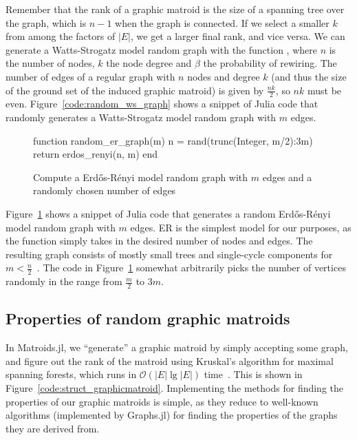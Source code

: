 Remember that the rank of a graphic matroid is the size of a spanning tree over the graph, which is $n-1$ when the graph is connected. If we select a smaller $k$ from among the factors of $|E|$, we get a larger final rank, and vice versa. We can generate a Watts-Strogatz model random graph with the function , where $n$ is the number of nodes, $k$ the node degree and $\beta$ the probability of rewiring. The number of edges of a regular graph with $n$ nodes and degree $k$ (and thus the size of the ground set of the induced graphic matroid) is given by $\frac{nk}{2}$, so $nk$ must be even. Figure~\ref{code:random_ws_graph} shows a snippet of Julia code that randomly generates a Watts-Strogatz model random graph with $m$ edges.

\begin{figure}[ht!]
  \begin{jllisting}
    
function random_er_graph(m)
  n = rand(trunc(Integer, m/2):3m)
  return erdos_renyi(n, m)
end

  \end{jllisting}
  \caption{Compute a Erdős-Rényi model random graph with $m$ edges and a randomly chosen number of edges}
  \label{code:random_er_graph}
\end{figure}

Figure~\ref{code:random_er_graph} shows a snippet of Julia code that generates a random Erdős-Rényi model random graph with $m$ edges. ER is the simplest model for our purposes, as the function  simply takes in the desired number of nodes and edges. The resulting graph consists of mostly small trees and single-cycle components for $m < \frac{n}{2}$~\cite{janson1993birth}. The code in Figure~\ref{code:random_er_graph} somewhat arbitrarily picks the number of vertices randomly in the range from $\frac{m}{2}$ to $3m$.


\subsection{Properties of random graphic matroids}


In Matroids.jl, we ``generate'' a graphic matroid by simply accepting some graph, and figure out the rank of the matroid using Kruskal's algorithm for maximal spanning forests, which runs in $\mathcal{O}(|E| \lg |E|)$ time~\cite{Cormen2009-zm}. This is shown in Figure~\ref{code:struct_graphicmatroid}. Implementing the methods for finding the properties of our graphic matroids is simple, as they reduce to well-known algorithms (implemented by Graphs.jl) for finding the properties of the graphs they are derived from. 

